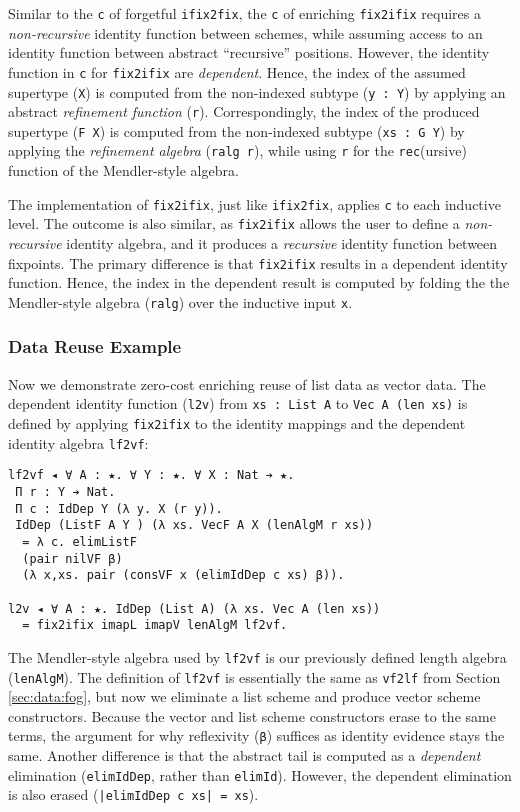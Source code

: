\documentclass[acmsmall]{acmart}\settopmatter{}
\newcommand{\refsec}[1]{Section \ref{sec:#1}}
\begin{document}
Similar to the \verb;c; of forgetful \verb;ifix2fix;,
the \verb;c; of enriching \verb;fix2ifix; requires a
\textit{non-recursive} identity function between schemes, while assuming
access to an identity function between abstract ``recursive''
positions. However, the identity function in \verb;c; for
\verb;fix2ifix; are \textit{dependent}. Hence, the index of the
assumed supertype (\verb;X;) is computed from the non-indexed
subtype (\verb;y : Y;) by applying an abstract
\textit{refinement function} (\verb;r;).
Correspondingly, the index of the produced supertype
(\verb;F X;) is computed from the non-indexed
subtype (\verb;xs : G Y;) by applying the
\textit{refinement algebra} (\verb;ralg r;), while using \verb;r; for
the \verb;rec;(ursive) function of the Mendler-style algebra.

The implementation of \verb;fix2ifix;, just like \verb;ifix2fix;,
applies \verb;c; to each inductive level. The outcome is also similar,
as \verb;fix2ifix; allows the user to define a \textit{non-recursive}
identity algebra, and it produces a \textit{recursive} identity
function between fixpoints. The primary difference is
that \verb;fix2ifix; results in a dependent identity function. Hence,
the index in the dependent result is computed by folding the
the Mendler-style algebra (\verb;ralg;) over the inductive input
\verb;x;. 

\subsubsection{Data Reuse Example}

Now we demonstrate zero-cost enriching reuse of list data as vector
data. The dependent identity function (\verb;l2v;)
from \verb;xs : List A; to \verb;Vec A (len xs); is defined by
applying \verb;fix2ifix; to the identity mappings and the
dependent identity algebra \verb;lf2vf;:

\begin{verbatim}
lf2vf ◂ ∀ A : ★. ∀ Y : ★. ∀ X : Nat ➔ ★.
 Π r : Y ➔ Nat. 
 Π c : IdDep Y (λ y. X (r y)).
 IdDep (ListF A Y ) (λ xs. VecF A X (lenAlgM r xs))
  = λ c. elimListF
  (pair nilVF β)
  (λ x,xs. pair (consVF x (elimIdDep c xs) β)).
 
l2v ◂ ∀ A : ★. IdDep (List A) (λ xs. Vec A (len xs))
  = fix2ifix imapL imapV lenAlgM lf2vf.
\end{verbatim}
The Mendler-style algebra used by \verb;lf2vf; is our previously
defined length algebra (\verb;lenAlgM;).
The definition of \verb;lf2vf; is essentially the same as
\verb;vf2lf; from \refsec{data:fog}, but now we eliminate a list
scheme and produce vector scheme constructors. Because the vector and
list scheme constructors erase to the same terms, the argument for why
reflexivity (\verb;β;) suffices as identity evidence stays the same.
Another difference is that the abstract tail is computed as a \textit{dependent}
elimination (\verb;elimIdDep;, rather than \verb;elimId;).
However, the dependent elimination is also erased
(\verb;|elimIdDep c xs| = xs;).
\end{document}
